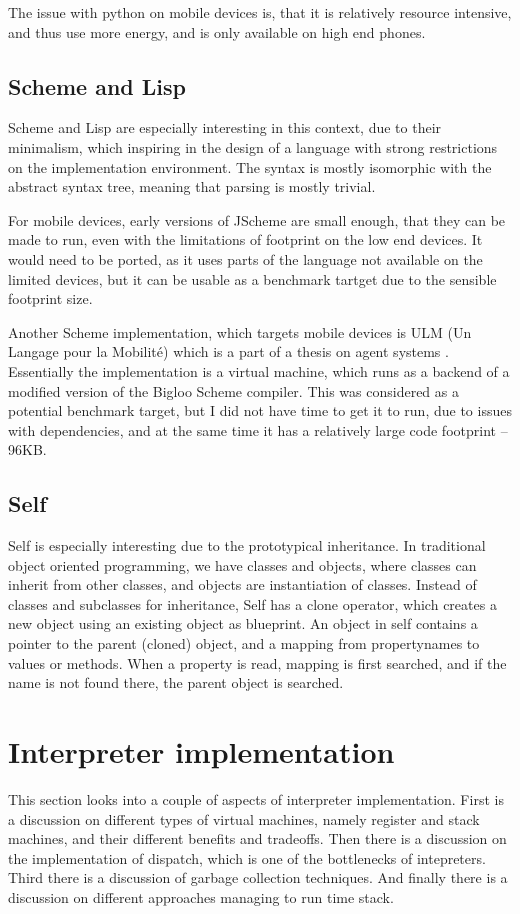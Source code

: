 \documentclass[11pt]{report}
\begin{document}
The issue with python on mobile devices is, that it is relatively resource intensive, and thus use more energy, and is only available on high end phones.

\subsection{Scheme and Lisp}
Scheme and Lisp are especially interesting in this context, due to their minimalism, which inspiring in the design of a language with strong restrictions on the implementation environment.
The syntax is mostly isomorphic with the abstract syntax tree, meaning that parsing is mostly trivial.

For mobile devices, early versions of JScheme \cite{norvig-jscheme} are small enough, that they can be made to run, even with the limitations of footprint on the low end devices. It would need to be ported, as it uses parts of the language not available on the limited devices, but it can be usable as a benchmark tartget due to the sensible footprint size.

Another Scheme implementation, which targets mobile devices is ULM (Un Langage pour la Mobilité) which is a part of a thesis on agent systems \cite{ulm}. Essentially the implementation is a virtual machine, which runs as a backend of a modified version of the Bigloo \cite{bigloo} Scheme compiler.
This was considered as a potential benchmark target, but I did not have time to get it to run, due to issues with dependencies, and at the same time it has a relatively large code footprint -- 96KB.

\subsection{Self}
\label{survey-self}
Self \cite{self} is especially interesting due to the prototypical inheritance.
In traditional object oriented programming, we have classes and objects, where classes can inherit from other classes, and objects are instantiation of classes.
Instead of classes and subclasses for inheritance, Self has a clone operator, which creates a new object using an existing object as blueprint.
An object in self contains a pointer to the parent (cloned) object, and a mapping from propertynames to values or methods. When a property is read, mapping is first searched, and if the name is not found there, the parent object is searched.

\section{Interpreter implementation}
\label{interpreter-implementation}
This section looks into a couple of aspects of interpreter implementation.
First is a discussion on different types of virtual machines, namely register and stack machines, and their different benefits and tradeoffs.
Then there is a discussion on the implementation of dispatch, which is one of the bottlenecks of intepreters.
Third there is a discussion of garbage collection techniques.
And finally there is a discussion on different approaches managing to run time stack.
\end{document}
